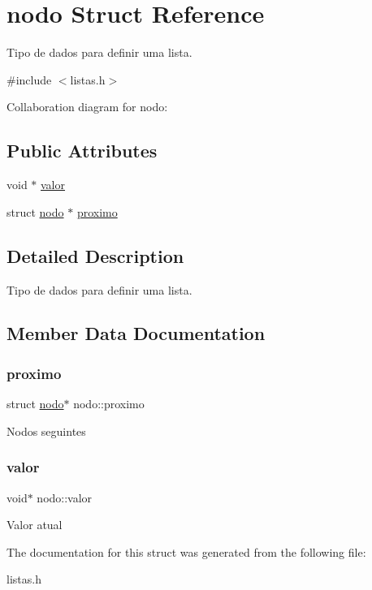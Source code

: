 \hypertarget{structnodo}{}\section{nodo Struct Reference}
\label{structnodo}


Tipo de dados para definir uma lista.  




{\ttfamily \#include $<$listas.\+h$>$}



Collaboration diagram for nodo\+:
\subsection*{Public Attributes}
\begin{DoxyCompactItemize}
\item 
void $\ast$ \hyperlink{structnodo_ab63adcdb83ea1fdcf4fa10f3cafc4a6a}{valor}
\item 
struct \hyperlink{structnodo}{nodo} $\ast$ \hyperlink{structnodo_aaaabdcb6641ddcdac8990402242b154a}{proximo}
\end{DoxyCompactItemize}


\subsection{Detailed Description}
Tipo de dados para definir uma lista. 

\subsection{Member Data Documentation}
\mbox{\label{structnodo_aaaabdcb6641ddcdac8990402242b154a}} 
\subsubsection{\texorpdfstring{proximo}{proximo}}
{\footnotesize\ttfamily struct \hyperlink{structnodo}{nodo}$\ast$ nodo\+::proximo}

Nodos seguintes \mbox{\label{structnodo_ab63adcdb83ea1fdcf4fa10f3cafc4a6a}} 
\subsubsection{\texorpdfstring{valor}{valor}}
{\footnotesize\ttfamily void$\ast$ nodo\+::valor}

Valor atual 

The documentation for this struct was generated from the following file\+:\begin{DoxyCompactItemize}
\item 
listas.\+h\end{DoxyCompactItemize}
